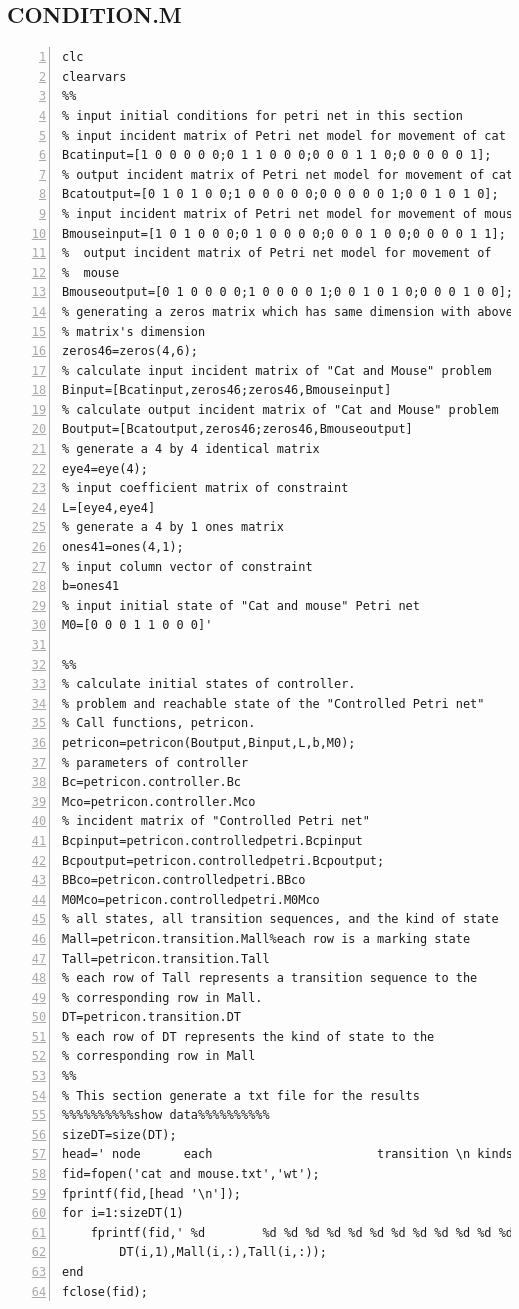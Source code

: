 \documentclass[11pt]{article}
\begin{document}
\begin{flushleft}
\section{CONDITION.M}
\begin{lstlisting}[numbers=left]
clc
clearvars
%%
% input initial conditions for petri net in this section
% input incident matrix of Petri net model for movement of cat
Bcatinput=[1 0 0 0 0 0;0 1 1 0 0 0;0 0 0 1 1 0;0 0 0 0 0 1];
% output incident matrix of Petri net model for movement of cat
Bcatoutput=[0 1 0 1 0 0;1 0 0 0 0 0;0 0 0 0 0 1;0 0 1 0 1 0];
% input incident matrix of Petri net model for movement of mouse
Bmouseinput=[1 0 1 0 0 0;0 1 0 0 0 0;0 0 0 1 0 0;0 0 0 0 1 1];
%  output incident matrix of Petri net model for movement of
%  mouse
Bmouseoutput=[0 1 0 0 0 0;1 0 0 0 0 1;0 0 1 0 1 0;0 0 0 1 0 0];
% generating a zeros matrix which has same dimension with above
% matrix's dimension
zeros46=zeros(4,6);
% calculate input incident matrix of "Cat and Mouse" problem
Binput=[Bcatinput,zeros46;zeros46,Bmouseinput]
% calculate output incident matrix of "Cat and Mouse" problem
Boutput=[Bcatoutput,zeros46;zeros46,Bmouseoutput]
% generate a 4 by 4 identical matrix 
eye4=eye(4);
% input coefficient matrix of constraint
L=[eye4,eye4]
% generate a 4 by 1 ones matrix
ones41=ones(4,1);
% input column vector of constraint
b=ones41
% input initial state of "Cat and mouse" Petri net
M0=[0 0 0 1 1 0 0 0]'

%%
% calculate initial states of controller.
% problem and reachable state of the "Controlled Petri net"
% Call functions, petricon.
petricon=petricon(Boutput,Binput,L,b,M0);
% parameters of controller
Bc=petricon.controller.Bc
Mco=petricon.controller.Mco
% incident matrix of "Controlled Petri net"
Bcpinput=petricon.controlledpetri.Bcpinput
Bcpoutput=petricon.controlledpetri.Bcpoutput;
BBco=petricon.controlledpetri.BBco
M0Mco=petricon.controlledpetri.M0Mco
% all states, all transition sequences, and the kind of state
Mall=petricon.transition.Mall%each row is a marking state
Tall=petricon.transition.Tall
% each row of Tall represents a transition sequence to the
% corresponding row in Mall.
DT=petricon.transition.DT
% each row of DT represents the kind of state to the
% corresponding row in Mall
%% 
% This section generate a txt file for the results
%%%%%%%%%%show data%%%%%%%%%%
sizeDT=size(DT);
head=' node      each                       transition \n kinds    states                       sequences';
fid=fopen('cat and mouse.txt','wt');
fprintf(fid,[head '\n']);
for i=1:sizeDT(1)
    fprintf(fid,' %d        %d %d %d %d %d %d %d %d %d %d %d %d         %d %d %d \n',...
        DT(i,1),Mall(i,:),Tall(i,:));
end
fclose(fid);
\end{lstlisting}


\end{flushleft}
\end{document}
